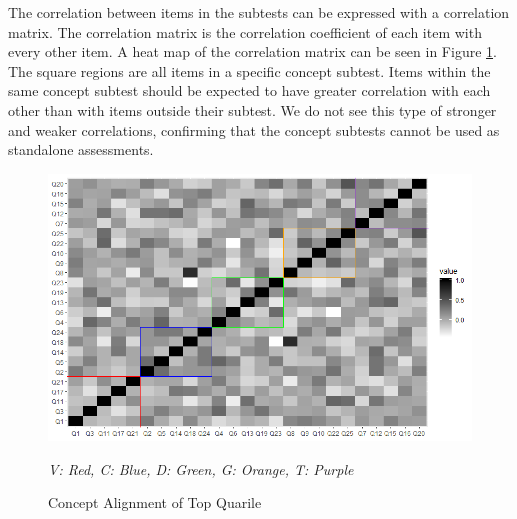 \begin{table}[!htbp]
\caption{Cronbach's $\alpha$ by Concept}
\centering
{}
\label{tab:alpha_concept}
\end{table}


\iflong

The correlation between items in the subtests can be expressed with a correlation matrix. The correlation matrix is the correlation coefficient of each item with every other item. A heat map of the correlation matrix can be seen in Figure \ref{fig:alignment}. The square regions are all items in a specific concept subtest. Items within the same concept subtest should be expected to have  greater correlation  with each other than with items outside their subtest. We do not see this type of stronger and weaker correlations, confirming that the concept subtests cannot be used as standalone assessments.

\begin{figure}[!hbp]
    \centering
    \includegraphics[scale=.35]{images/heat_map_top_quarter.png}
    \begin{minipage}{0.65\linewidth}
    \tiny
    \emph{
    V: Red,
    C: Blue,
    D: Green,
    G: Orange,
    T: Purple
    }
    \end{minipage}
    \caption{Concept Alignment of Top Quarile}
    \label{fig:alignment}
\end{figure}
\fi

